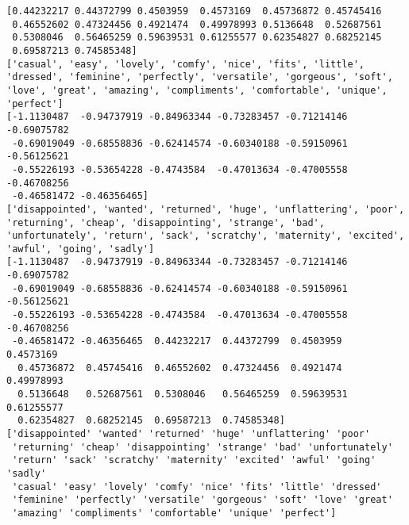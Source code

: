 \documentclass[11pt]{article}
\begin{document}
    \begin{Verbatim}[commandchars=\\\{\}]
[0.44232217 0.44372799 0.4503959  0.4573169  0.45736872 0.45745416
 0.46552602 0.47324456 0.4921474  0.49978993 0.5136648  0.52687561
 0.5308046  0.56465259 0.59639531 0.61255577 0.62354827 0.68252145
 0.69587213 0.74585348]
['casual', 'easy', 'lovely', 'comfy', 'nice', 'fits', 'little', 'dressed', 'feminine', 'perfectly', 'versatile', 'gorgeous', 'soft', 'love', 'great', 'amazing', 'compliments', 'comfortable', 'unique', 'perfect']
[-1.1130487  -0.94737919 -0.84963344 -0.73283457 -0.71214146 -0.69075782
 -0.69019049 -0.68558836 -0.62414574 -0.60340188 -0.59150961 -0.56125621
 -0.55226193 -0.53654228 -0.4743584  -0.47013634 -0.47005558 -0.46708256
 -0.46581472 -0.46356465]
['disappointed', 'wanted', 'returned', 'huge', 'unflattering', 'poor', 'returning', 'cheap', 'disappointing', 'strange', 'bad', 'unfortunately', 'return', 'sack', 'scratchy', 'maternity', 'excited', 'awful', 'going', 'sadly']
[-1.1130487  -0.94737919 -0.84963344 -0.73283457 -0.71214146 -0.69075782
 -0.69019049 -0.68558836 -0.62414574 -0.60340188 -0.59150961 -0.56125621
 -0.55226193 -0.53654228 -0.4743584  -0.47013634 -0.47005558 -0.46708256
 -0.46581472 -0.46356465  0.44232217  0.44372799  0.4503959   0.4573169
  0.45736872  0.45745416  0.46552602  0.47324456  0.4921474   0.49978993
  0.5136648   0.52687561  0.5308046   0.56465259  0.59639531  0.61255577
  0.62354827  0.68252145  0.69587213  0.74585348]
['disappointed' 'wanted' 'returned' 'huge' 'unflattering' 'poor'
 'returning' 'cheap' 'disappointing' 'strange' 'bad' 'unfortunately'
 'return' 'sack' 'scratchy' 'maternity' 'excited' 'awful' 'going' 'sadly'
 'casual' 'easy' 'lovely' 'comfy' 'nice' 'fits' 'little' 'dressed'
 'feminine' 'perfectly' 'versatile' 'gorgeous' 'soft' 'love' 'great'
 'amazing' 'compliments' 'comfortable' 'unique' 'perfect']

    \end{Verbatim}

    \begin{center}
    \end{center}
    { \hspace*{\fill} \\}
    
\end{document}
